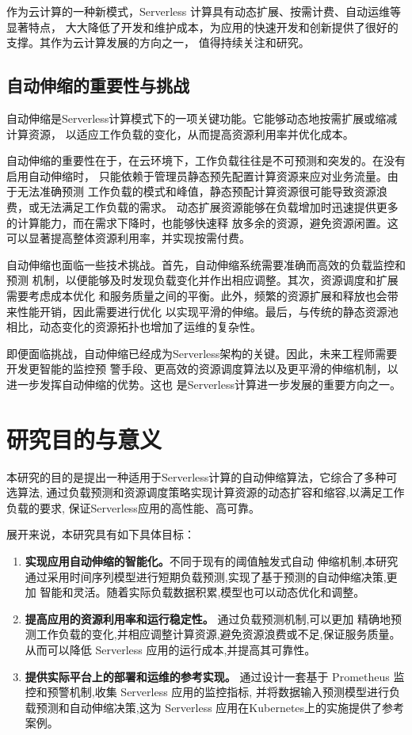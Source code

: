 \documentclass[a4paper,AutoFakeBold,oneside,12pt]{book}
\begin{document}
作为云计算的一种新模式，Serverless 计算具有动态扩展、按需计费、自动运维等显著特点，
大大降低了开发和维护成本，为应用的快速开发和创新提供了很好的支撑。其作为云计算发展的方向之一，
值得持续关注和研究。 

\subsection{自动伸缩的重要性与挑战}

自动伸缩是Serverless计算模式下的一项关键功能。它能够动态地按需扩展或缩减计算资源，
以适应工作负载的变化，从而提高资源利用率并优化成本。

自动伸缩的重要性在于，在云环境下，工作负载往往是不可预测和突发的。在没有启用自动伸缩时，
只能依赖于管理员静态预先配置计算资源来应对业务流量。由于无法准确预测
工作负载的模式和峰值，静态预配计算资源很可能导致资源浪费，或无法满足工作负载的需求。
动态扩展资源能够在负载增加时迅速提供更多的计算能力，而在需求下降时，也能够快速释
放多余的资源，避免资源闲置。这可以显著提高整体资源利用率，并实现按需付费。

自动伸缩也面临一些技术挑战。首先，自动伸缩系统需要准确而高效的负载监控和预测
机制，以便能够及时发现负载变化并作出相应调整。其次，资源调度和扩展需要考虑成本优化
和服务质量之间的平衡。此外，频繁的资源扩展和释放也会带来性能开销，因此需要进行优化
以实现平滑的伸缩。最后，与传统的静态资源池相比，动态变化的资源拓扑也增加了运维的复杂性。

即便面临挑战，自动伸缩已经成为Serverless架构的关键。因此，未来工程师需要开发更智能的监控预
警手段、更高效的资源调度算法以及更平滑的伸缩机制，以进一步发挥自动伸缩的优势。这也
是Serverless计算进一步发展的重要方向之一。

\section{研究目的与意义}

本研究的目的是提出一种适用于Serverless计算的自动伸缩算法，它综合了多种可选算法,
通过负载预测和资源调度策略实现计算资源的动态扩容和缩容,以满足工作负载的要求,
保证Serverless应用的高性能、高可靠。 

展开来说，本研究具有如下具体目标：

\begin{enumerate}

	\item \textbf{实现应用自动伸缩的智能化。}不同于现有的阈值触发式自动
	伸缩机制,本研究通过采用时间序列模型进行短期负载预测,实现了基于预测的自动伸缩决策,更加
	智能和灵活。随着实际负载数据积累,模型也可以动态优化和调整。  

	\item \textbf{提高应用的资源利用率和运行稳定性。}
	通过负载预测机制,可以更加
	精确地预测工作负载的变化,并相应调整计算资源,避免资源浪费或不足,保证服务质量。
	从而可以降低 Serverless 应用的运行成本,并提高其可靠性。

	\item \textbf{提供实际平台上的部署和运维的参考实现。}
	通过设计一套基于 Prometheus 监控和预警机制,收集 Serverless 应用的监控指标,
	并将数据输入预测模型进行负载预测和自动伸缩决策,这为 Serverless 应用在Kubernetes上的实施提供了参考案例。
\end{enumerate}
\end{document}
